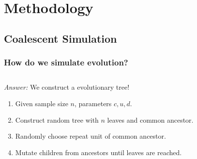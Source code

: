 \documentclass[11pt]{beamer}
\begin{document}
    \section{Methodology}\label{sec:m}
	\subsection{Coalescent Simulation}\label{subsec:c}
    \begin{frame}
        \frametitle{How do we simulate evolution?}
        \begin{columns}
            \begin{column}{0.6\textwidth}
                \emph{Answer:} We construct a evolutionary tree! \medskip
                \begin{enumerate}
                    \item Given sample size $n$, parameters $c, u, d$. \medskip
                    \item Construct random tree with $n$ leaves and common ancestor. \medskip
                    \item Randomly choose repeat unit of common ancestor. \medskip
                    \item Mutate children from ancestors until leaves are reached.
                \end{enumerate}
            \end{column}
            \begin{column}{0.4\textwidth}
                \centering{}
            \end{column}
        \end{columns}

        \note{
            \footnotesize
            \begin{enumerate}
                \item
            \end{enumerate}
        }
    \end{frame}
\end{document}
